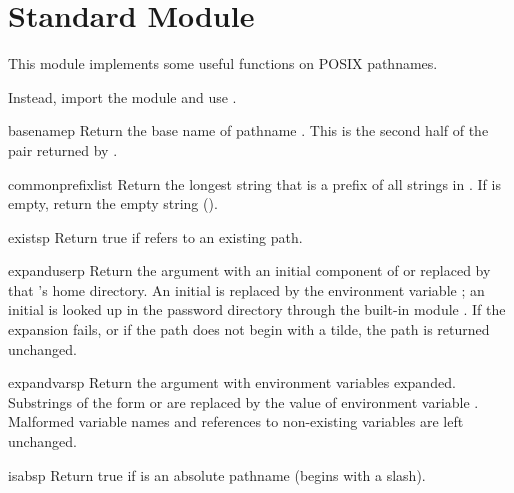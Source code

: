 \section{Standard Module }
\label{module-posixpath}

This module implements some useful functions on POSIX pathnames.

  Instead, import the
module  and use .

\renewcommand{\indexsubitem}{(in module posixpath)}

\begin{funcdesc}{basename}{p}
Return the base name of pathname
.
This is the second half of the pair returned by
.
\end{funcdesc}

\begin{funcdesc}{commonprefix}{list}
Return the longest string that is a prefix of all strings in
.
If
is empty, return the empty string ().
\end{funcdesc}

\begin{funcdesc}{exists}{p}
Return true if
refers to an existing path.
\end{funcdesc}

\begin{funcdesc}{expanduser}{p}
Return the argument with an initial component of \samp{\~} or
 replaced by that 's home directory.  An
initial \samp{\~{}} is replaced by the environment variable ;
an initial  is looked up in the password directory through
the built-in module .  If the expansion fails, or if the
path does not begin with a tilde, the path is returned unchanged.
\end{funcdesc}

\begin{funcdesc}{expandvars}{p}
Return the argument with environment variables expanded.  Substrings
of the form  or  are
replaced by the value of environment variable .  Malformed
variable names and references to non-existing variables are left
unchanged.
\end{funcdesc}

\begin{funcdesc}{isabs}{p}
Return true if  is an absolute pathname (begins with a slash).
\end{funcdesc}


